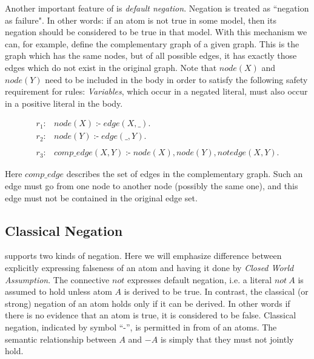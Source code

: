 \documentclass[14pt,a4paper, titlepage]{article}
\DeclareMathOperator{\leftimpl}{:-}
\begin{document}
Another important feature of \dlvhex{} is \emph{default 
negation}. Negation is treated as ``negation as failure". 
In other words: if an atom is not true in some model, then 
its negation should be considered to be true in that model. 
With this mechanism we can, for example, define the 
complementary graph of a given graph. This is the graph 
which has the same nodes, but of all possible edges, it has 
exactly those edges which do not exist in the original 
graph. Note that $\mathit{node}(X)$ and $\mathit{node}(Y)$ 
need to be included in the body in order to satisfy the 
following safety requirement for rules: \emph{Variables}, 
which occur in a negated literal, must also occur in a 
positive literal in the body.
\begin{exmp}
\begin{align*}
r_1\colon& \mathit{node}(X) \leftimpl \mathit{edge}(X, \_).
\\
r_2\colon& \mathit{node}(Y) \leftimpl \mathit{edge}(\_, Y). 
\\
\\
r_3\colon& \mathit{comp\_edge}(X, Y) \leftimpl 
\mathit{node}(X), \mathit{node}(Y), \mathit{ not } \mathit{ 
edge }(X, Y). 
\end{align*}
\end{exmp}
Here $\mathit{comp\_edge}$ describes the set of edges in 
the complementary graph. Such an edge must go from one node 
to another node (possibly the same one), and this edge must 
not be contained in the original edge set. 

\subsection{Classical Negation}
\dlvhex{} supports two kinds of negation. Here we will 
emphasize difference between explicitly expressing 
falseness of an atom and having it done by \emph{Closed 
World Assumption}. The connective $\mathit{not}$ expresses 
default negation, i.e. a literal $\mathit{not} \ A$ is assumed 
to hold unless atom $A$ is derived to be true. In contrast, 
the classical (or strong) negation of an atom holds only if 
it can be derived. In other words if there is no evidence 
that an atom is true, it is considered to be false. 
Classical negation, indicated by symbol ``-'', is 
permitted in from of an atoms. The semantic relationship 
between $A$ and $\mathit{-A}$ is simply that they must not jointly 
hold.
\end{document}
